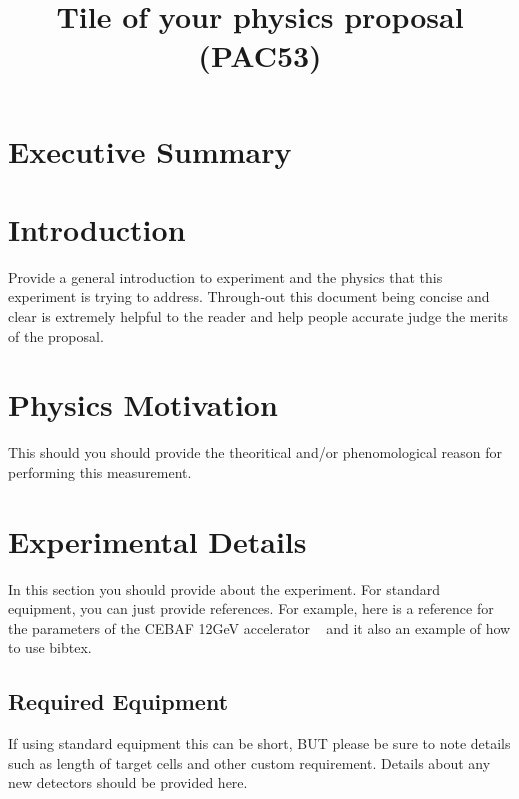 \documentclass[titlepage,10pt]{article}
\begin{document}
\title{Tile of your physics proposal \\(PAC53)} %


\maketitle

\section*{Executive Summary}

\newpage

\section{Introduction}

Provide a general introduction to experiment and the physics that this experiment is trying to address.   Through-out this document being concise and clear is extremely helpful to the reader and help people accurate judge the merits of the proposal.    

\section{Physics Motivation}

This should you should provide the theoritical and/or phenomological reason for performing this measurement.

\section{Experimental Details}

In this section you should provide about the experiment.   For standard equipment, you can just provide references.  For example, here is a reference for the parameters of 
the CEBAF 12GeV accelerator ~\cite{Adderley:2024czm} and it also an example of how to use bibtex.  

\subsection{Required Equipment}

If using standard equipment this can be short, BUT please be sure to note details such as length of target cells and other custom requirement.   Details about any new detectors should be provided here.
\end{document}
